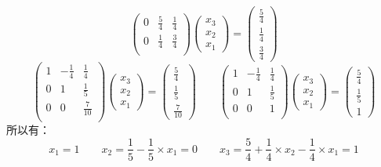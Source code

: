 \documentclass[12pt, onecolumn]{article}
\begin{document}
{\begin{equation*}
\begin{pmatrix}
		0&\frac{5}{4}&\frac{1}{4}\\
		0&\frac{1}{4}&\frac{3}{4}\\
		\end{pmatrix}\begin{pmatrix}
		x_3\\x_2\\x_1
		\end{pmatrix}=\begin{pmatrix}
		\frac{5}{4}\\\frac{1}{4}\\\frac{3}{4}
		\end{pmatrix}
	\end{equation*}
	\begin{equation*}
		\begin{pmatrix}
		1&-\frac{1}{4}&\frac{1}{4}\\
		0&1&\frac{1}{5}\\
		0&0&\frac{7}{10}\\
		\end{pmatrix}\begin{pmatrix}
		x_3\\x_2\\x_1
		\end{pmatrix}=\begin{pmatrix}
		\frac{5}{4}\\\frac{1}{5}\\\frac{7}{10}
		\end{pmatrix}
		\qquad
		\begin{pmatrix}
		1&-\frac{1}{4}&\frac{1}{4}\\
		0&1&\frac{1}{5}\\
		0&0&1\\
		\end{pmatrix}\begin{pmatrix}
		x_3\\x_2\\x_1
		\end{pmatrix}=\begin{pmatrix}
		\frac{5}{4}\\\frac{1}{5}\\1
		\end{pmatrix}
	\end{equation*}
	所以有：
	\begin{equation}
	x_1=1\qquad x_2=\frac{1}{5}-\frac{1}{5}\times x_1=0
	\qquad
	x_3=\frac{5}{4}+\frac{1}{4}\times x_2-\frac{1}{4}\times x_1=1
	\end{equation}
	}
	
\end{document}
